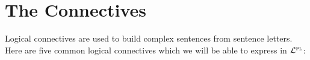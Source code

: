 %
%





\section{The Connectives}
  \label{sec.connectives}

Logical connectives are used to build complex sentences from sentence letters.
Here are five common logical connectives which we will be able to express in $\mathcal{L}^{\textsc{pl}}$:

